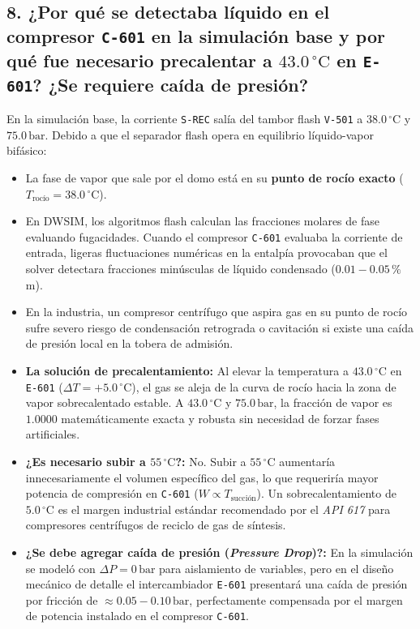\documentclass[11pt,a4paper]{article}
\begin{document}
\subsection{8. ¿Por qué se detectaba líquido en el compresor \texttt{C-601} en la simulación base y por qué fue necesario precalentar a \texorpdfstring{$43.0\,^\circ\text{C}$}{43.0 °C} en \texttt{E-601}? ¿Se requiere caída de presión?}
En la simulación base, la corriente \texttt{S-REC} salía del tambor flash \texttt{V-501} a $38.0\,^\circ\text{C}$ y $75.0\,\text{bar}$. Debido a que el separador flash opera en equilibrio líquido-vapor bifásico:
\begin{itemize}
    \item La fase de vapor que sale por el domo está en su \textbf{punto de rocío exacto} ($T_{\text{rocío}} = 38.0\,^\circ\text{C}$).
    \item En DWSIM, los algoritmos flash calculan las fracciones molares de fase evaluando fugacidades. Cuando el compresor \texttt{C-601} evaluaba la corriente de entrada, ligeras fluctuaciones numéricas en la entalpía provocaban que el solver detectara fracciones minúsculas de líquido condensado ($0.01 - 0.05\,\%$ m).
    \item En la industria, un compresor centrífugo que aspira gas en su punto de rocío sufre severo riesgo de condensación retrograda o cavitación si existe una caída de presión local en la tobera de admisión.
    \item \textbf{La solución de precalentamiento:} Al elevar la temperatura a \textbf{$43.0\,^\circ\text{C}$} en \texttt{E-601} ($\Delta T = +5.0\,^\circ\text{C}$), el gas se aleja de la curva de rocío hacia la zona de vapor sobrecalentado estable. A $43.0\,^\circ\text{C}$ y $75.0\,\text{bar}$, la fracción de vapor es $1.0000$ matemáticamente exacta y robusta sin necesidad de forzar fases artificiales.
    \item \textbf{¿Es necesario subir a $55\,^\circ\text{C}$?:} No. Subir a $55\,^\circ\text{C}$ aumentaría innecesariamente el volumen específico del gas, lo que requeriría mayor potencia de compresión en \texttt{C-601} ($W \propto T_{\text{succión}}$). Un sobrecalentamiento de $5.0\,^\circ\text{C}$ es el margen industrial estándar recomendado por el \textit{API 617} para compresores centrífugos de reciclo de gas de síntesis.
    \item \textbf{¿Se debe agregar caída de presión (\textit{Pressure Drop})?:} En la simulación se modeló con $\Delta P = 0\,\text{bar}$ para aislamiento de variables, pero en el diseño mecánico de detalle el intercambiador \texttt{E-601} presentará una caída de presión por fricción de $\approx 0.05 - 0.10\,\text{bar}$, perfectamente compensada por el margen de potencia instalado en el compresor \texttt{C-601}.
\end{itemize}
\end{document}
